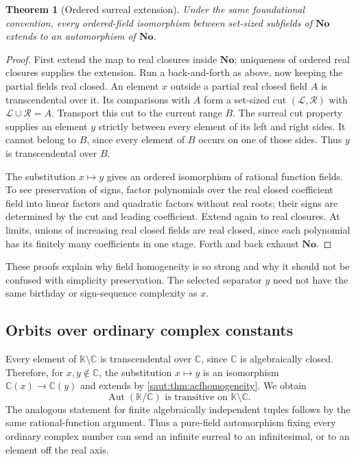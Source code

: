 \documentclass[11pt]{article}
\newtheorem{theorem}{Theorem}[section]
\theoremstyle{definition}
\theoremstyle{remark}
\newcommand{\No}{\mathbf{No}}
\newcommand{\C}{\mathbb C}
\newcommand{\K}{\mathbb K}
\newcommand{\Aut}{\operatorname{Aut}}
\numberwithin{equation}{section}
\begin{document}
\begin{theorem}[Ordered surreal extension]\label{saut:thm:orderedhomogeneity}
Under the same foundational convention, every ordered-field isomorphism
between set-sized subfields of $\No$ extends to an automorphism of $\No$.
\end{theorem}
\begin{proof}
First extend the map to real closures inside $\No$; uniqueness of ordered
real closures supplies the extension. Run a back-and-forth as above, now
keeping the partial fields real closed. An element $x$ outside a partial
real closed field $A$ is transcendental over it. Its comparisons with $A$
form a set-sized cut $(\mathcal L,\mathcal R)$ with $\mathcal L\cup\mathcal R=A$.
Transport this cut to the current range $B$. The surreal cut property
supplies an element $y$ strictly between every element of its left and
right sides. It cannot belong to $B$, since every element of $B$ occurs
on one of those sides. Thus $y$ is transcendental over $B$.

The substitution $x\mapsto y$ gives an ordered isomorphism of rational
function fields. To see preservation of signs, factor polynomials over
the real closed coefficient field into linear factors and quadratic
factors without real roots; their signs are determined by the cut and
leading coefficient. Extend again to real closures. At limits, unions of
increasing real closed fields are real closed, since each polynomial has
its finitely many coefficients in one stage. Forth and back exhaust $\No$.
\end{proof}

These proofs explain why field homogeneity is so strong and why it should
not be confused with simplicity preservation. The selected separator $y$
need not have the same birthday or sign-sequence complexity as $x$.

\subsection{Orbits over ordinary complex constants}

Every element of $\K\setminus\C$ is transcendental over $\C$, since $\C$
is algebraically closed. Therefore, for $x,y\notin\C$, the substitution
$x\mapsto y$ is an isomorphism $\C(x)\to\C(y)$ and extends by
\cref{saut:thm:acfhomogeneity}. We obtain
\begin{equation}\label{saut:eq:transitive}
 \Aut(\K/\C)\text{ is transitive on }\K\setminus\C.
\end{equation}
The analogous statement for finite algebraically independent tuples follows
by the same rational-function argument. Thus a pure-field automorphism
fixing every ordinary complex number can send an infinite surreal to an
infinitesimal, or to an element off the real axis.
\end{document}
